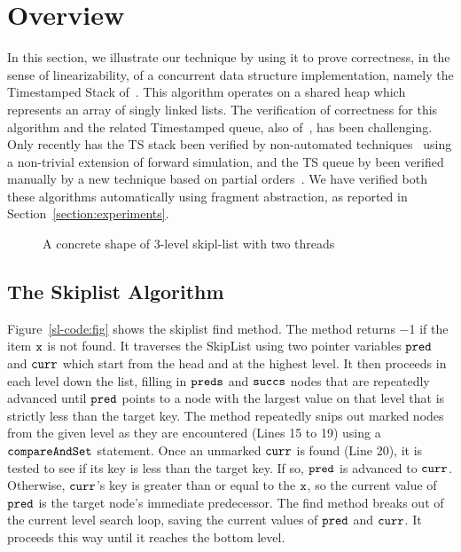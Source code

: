 \section{Overview}
\label{sec:overview-ts}

In this section, we illustrate our technique by using it to prove correctness, in
the sense of linearizability, of
a concurrent data structure implementation, namely the Timestamped Stack
of~\cite{ts-stack}. This algorithm operates on a shared heap which represents
an array of singly linked lists.
The verification of correctness for this algorithm and the related
Timestamped queue, also of~\cite{ts-stack}, has been challenging. Only
recently has the TS stack been verified by non-automated
techniques~\cite{bouajjani:icalp17:rep} using a non-trivial extension of
forward simulation, and the TS queue by been verified manually by a new technique
based on partial orders~\cite{ts-stack}.
We have verified both these algorithms automatically using fragment abstraction,
as reported in Section~\ref{section:experiments}.

\begin{figure}
\center  
   
 \caption{A concrete shape of 3-level skipl-list with two threads}
\label{sl-shape}
\end{figure}



\subsection{The Skiplist Algorithm}
Figure~\ref{sl-code:fig} shows the skiplist find method. The method returns −1 if the item  $\tt x$ is not found. It traverses the SkipList using two pointer variables $\tt pred$ and $\tt curr$ which start from the head and at the highest level. It then proceeds in each level down the list, filling in $\tt preds$
and $\tt succs$ nodes that are repeatedly advanced until $\tt pred$ points to a node with
the largest value on that level that is strictly less than the target key. The method repeatedly snips out marked nodes from the
given level as they are encountered (Lines 15 to 19) using a $\tt compareAndSet$ statement. Once an unmarked $\tt curr$ is found (Line 20), it is
tested to see if its key is less than the target key. If so, $\tt pred$ is advanced to $\tt curr$. Otherwise, $\tt curr$’s key is greater than or equal to the $\tt x$, so the current value
of $\tt pred$ is the target node’s immediate predecessor. The find method breaks
out of the current level search loop, saving the current values of $\tt pred$ and $\tt curr$. It proceeds this way until it reaches the bottom level.
